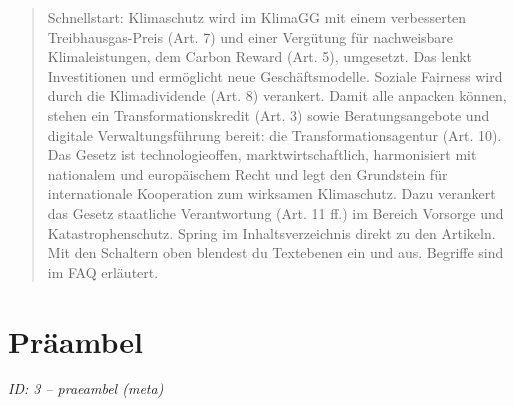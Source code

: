 \documentclass[12pt,a4paper]{scrartcl}
\begin{document}
\begin{quote}
Schnellstart: Klimaschutz wird im KlimaGG mit einem verbesserten Treibhausgas-Preis (Art. 7) und einer Vergütung für nachweisbare Klimaleistungen, dem Carbon Reward (Art. 5), umgesetzt. Das lenkt Investitionen und ermöglicht neue Geschäftsmodelle. Soziale Fairness wird durch die Klimadividende (Art. 8) verankert. Damit alle anpacken können, stehen ein Transformationskredit (Art. 3) sowie Beratungsangebote und digitale Verwaltungsführung bereit: die Transformationsagentur (Art. 10). Das Gesetz ist technologieoffen, marktwirtschaftlich, harmonisiert mit nationalem und europäischem Recht und legt den Grundstein für internationale Kooperation zum wirksamen Klimaschutz. Dazu verankert das Gesetz staatliche Verantwortung (Art. 11 ff.) im Bereich Vorsorge und Katastrophenschutz. Spring im Inhaltsverzeichnis direkt zu den Artikeln. Mit den Schaltern oben blendest du Textebenen ein und aus. Begriffe sind im FAQ erläutert.
\end{quote}


\section[Präambel]{Präambel}
\noindent\textit{ID: 3 -- praeambel (meta)}
\end{document}
